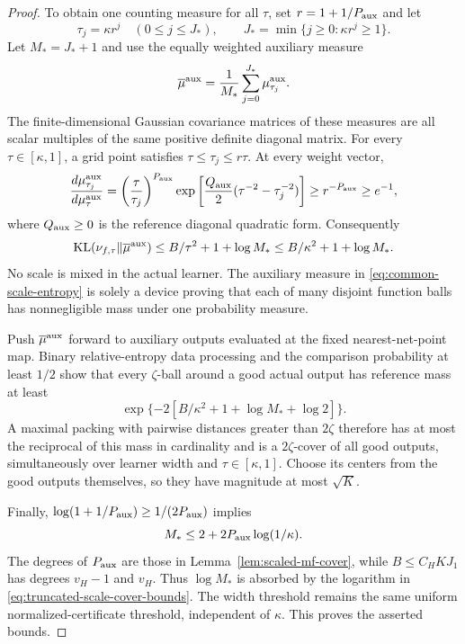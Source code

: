 \begin{proof}
To obtain one counting measure for all $\tau$, set
$r=1+1/P_{\rm aux}$ and let
\[
 \tau_j=\kappa r^j\quad(0\leq j\leq J_*),
 \qquad J_* = \min\{j\geq0:\kappa r^j\geq1\}.
\]
Let $M_*=J_*+1$ and use the equally weighted auxiliary measure
\[
 \overline\mu^{\rm aux}=\frac1{M_*}
                   \sum_{j=0}^{J_*}\mu_{\tau_j}^{\rm aux}.
\]
The finite-dimensional Gaussian covariance matrices of these measures
are all scalar multiples of the same positive definite diagonal matrix.
For every $\tau\in[\kappa,1]$, a grid point satisfies
$\tau\leq\tau_j\leq r\tau$.  At every weight vector,
\[
 \frac{d\mu_{\tau_j}^{\rm aux}}{d\mu_\tau^{\rm aux}}
 =\left(\frac\tau{\tau_j}\right)^{P_{\rm aux}}
   \exp\left[\frac{Q_{
       \rm aux}}2(\tau^{-2}-\tau_j^{-2})\right]
 \geq r^{-P_{\rm aux}}\geq e^{-1},
\]
where $Q_{\rm aux}\geq0$ is the reference diagonal quadratic form.
Consequently
\begin{equation}
 \operatorname{KL}(\nu_{f,\tau}\Vert\overline\mu^{\rm aux})
 \leq B/\tau^2+1+\log M_*
 \leq B/\kappa^2+1+\log M_*.
 \label{eq:common-scale-entropy}
\end{equation}
No scale is mixed in the actual learner.  The auxiliary measure in
\eqref{eq:common-scale-entropy} is solely a device proving that each
of many disjoint function balls has nonnegligible mass under one
probability measure.

Push $\overline\mu^{\rm aux}$ forward to auxiliary outputs evaluated
at the fixed nearest-net-point map.  Binary relative-entropy data
processing and the comparison probability at least $1/2$ show that
every $\zeta$-ball around a good actual output has reference mass at
least
\[
 \exp\{-2[B/\kappa^2+1+\log M_*+\log2]\}.
\]
A maximal packing with pairwise distances greater than $2\zeta$
therefore has at most the reciprocal of this mass in cardinality and
is a $2\zeta$-cover of all good outputs, simultaneously over learner
width and $\tau\in[\kappa,1]$.  Choose its centers from the good
outputs themselves, so they have magnitude at most $\sqrt K$.

Finally, $\log(1+1/P_{\rm aux})\geq1/(2P_{\rm aux})$ implies
\[
 M_*\leq2+2P_{\rm aux}\log(1/\kappa).
\]
The degrees of $P_{\rm aux}$ are those in
Lemma~\ref{lem:scaled-mf-cover}, while
$B\leq C_HKJ_1$ has degrees $v_H-1$ and $v_H$.
Thus $\log M_*$ is absorbed by the logarithm in
\eqref{eq:truncated-scale-cover-bounds}.  The width threshold remains
the same uniform normalized-certificate threshold, independent of
$\kappa$.  This proves the asserted bounds.
\end{proof}
